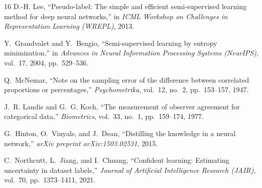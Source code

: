 \documentclass[journal,a4paper]{IEEEtran}
\begin{document}
\begin{thebibliography}{16}
D.-H. Lee, ``Pseudo-label: The simple and efficient semi-supervised learning method for deep neural networks,'' in \textit{ICML Workshop on Challenges in Representation Learning (WREPL)}, 2013.

Y.~Grandvalet and Y.~Bengio, ``Semi-supervised learning by entropy minimization,'' in \textit{Advances in Neural Information Processing Systems (NeurIPS)}, vol.~17, 2004, pp.~529--536.

Q.~McNemar, ``Note on the sampling error of the difference between correlated proportions or percentages,'' \textit{Psychometrika}, vol.~12, no.~2, pp.~153--157, 1947.

J.~R. Landis and G.~G. Koch, ``The measurement of observer agreement for categorical data,'' \textit{Biometrics}, vol.~33, no.~1, pp.~159--174, 1977.

G.~Hinton, O.~Vinyals, and J.~Dean, ``Distilling the knowledge in a neural network,'' \textit{arXiv preprint arXiv:1503.02531}, 2015.

C.~Northcutt, L.~Jiang, and I.~Chuang, ``Confident learning: Estimating uncertainty in dataset labels,'' \textit{Journal of Artificial Intelligence Research (JAIR)}, vol.~70, pp.~1373--1411, 2021.

\end{thebibliography}
\end{document}
